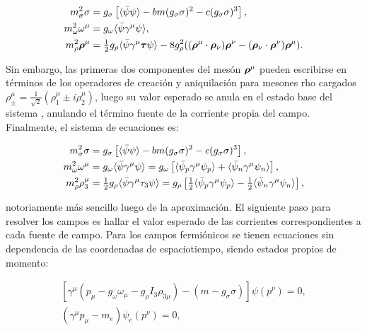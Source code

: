 \begin{equation*}
	\begin{aligned}
		m_\sigma^2 \sigma &= g_\sigma \left[ \langle \bar{\psi} \psi \rangle - bm(g_\sigma\sigma)^2 - c(g_\sigma\sigma)^3\right], \\
		m_\omega^2 \omega^\mu &= g_{\omega} \langle \bar{\psi} \gamma^\mu \psi \rangle, \\
		m_\rho^2 \boldsymbol{\rho}^\mu &= \tfrac{1}{2} g_{\rho} \langle \bar{\psi} \gamma^\mu \boldsymbol{\tau} \psi \rangle - 8g_\rho^2( (\boldsymbol{\rho}^\mu \cdot \boldsymbol{\rho}_\nu)\boldsymbol{\rho}^\nu - (\boldsymbol{\rho}_\nu \cdot \boldsymbol{\rho}^\nu)\boldsymbol{\rho}^\mu).
	\end{aligned}
\end{equation*}

Sin embargo, las primeras dos componentes del mesón $\boldsymbol{\rho}^\mu$ pueden escribirse en términos de los operadores de creación y aniquilación para mesones rho cargados $\rho_\pm^\mu = \frac{1}{\sqrt{2}}(\rho_1^\mu\pm i\rho_2^\mu)$, luego su valor esperado se anula en el estado base del sistema \cite{glendenningCompactStarsNuclear2000}, anulando el término fuente de la corriente propia del campo. Finalmente, el sistema de ecuaciones es:

\begin{equation}
	\begin{aligned}
		m_\sigma^2 \sigma &= g_\sigma \left[\langle \bar{\psi} \psi \rangle - bm(g_\sigma\sigma)^2 - c(g_\sigma\sigma)^3\right], \\
		m_\omega^2 \omega^\mu &= g_{\omega} \langle \bar{\psi} \gamma^\mu \psi \rangle = g_\omega \left[\langle \bar{\psi}_p \gamma^\mu \psi_p \rangle + \langle \bar{\psi}_n \gamma^\mu \psi_n \rangle \right], \\
		m_\rho^2 \rho_3^\mu &= \tfrac{1}{2} g_{\rho} \langle \bar{\psi} \gamma^\mu \tau_3 \psi \rangle = g_\rho \left[\tfrac{1}{2} \langle \bar{\psi}_p \gamma^\mu \psi_p \rangle - \tfrac{1}{2} \langle \bar{\psi}_n \gamma^\mu \psi_n \rangle \right],
		\label{eq:eom_meson_mf}
	\end{aligned}
\end{equation}

notoriamente más sencillo luego de la aproximación. El siguiente paso para resolver los campos es hallar el valor esperado de las corrientes correspondientes a cada fuente de campo. Para los campos fermiónicos se tienen ecuaciones sin dependencia de las coordenadas de espaciotiempo, siendo estados propios de momento:

\begin{equation}
	\begin{gathered}
		\left[ \gamma^\mu \left( p_\mu - g_{\omega} \omega_\mu - g_{\rho} I_3 \rho_{3\mu} \right) - (m - g_{\sigma} \sigma) \right] \psi(p^\nu) = 0, \\
		(\gamma^\mu p_\mu - m_e) \psi_e(p^\nu) = 0,
		\label{eq:eom_fermion_mf}
	\end{gathered}
\end{equation}


